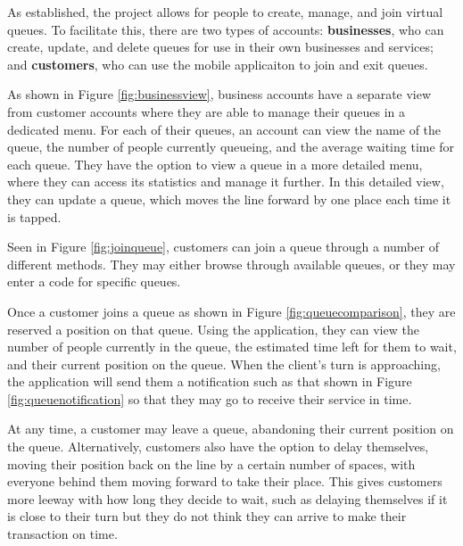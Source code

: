 As established, the project allows for people to create, manage, and join virtual queues. To facilitate this, there are two types of accounts: \textbf{businesses}, who can create, update, and delete queues for use in their own businesses and services; and \textbf{customers}, who can use the mobile applicaiton to join and exit queues.

As shown in Figure \ref{fig:businessview}, business accounts have a separate view from customer accounts where they are able to manage their queues in a dedicated menu. For each of their queues, an account can view the name of the queue, the number of people currently queueing, and the average waiting time for each queue. They have the option to view a queue in a more detailed menu, where they can access its statistics and manage it further. In this detailed view, they can update a queue, which moves the line forward by one place each time it is tapped.

Seen in Figure \ref{fig:joinqueue}, customers can join a queue through a number of different methods. They may either browse through available queues, or they may enter a code for specific queues. 

Once a customer joins a queue as shown in Figure \ref{fig:queuecomparison}, they are reserved a position on that queue. Using the application, they can view the number of people currently in the queue, the estimated time left for them to wait, and their current position on the queue. When the client’s turn is approaching, the application will send them a notification such as that shown in Figure \ref{fig:queuenotification} so that they may go to receive their service in time. 

At any time, a customer may leave a queue, abandoning their current position on the queue. Alternatively, customers also have the option to delay themselves, moving their position back on the line by a certain number of spaces, with everyone behind them moving forward to take their place. This gives customers more leeway with how long they decide to wait, such as delaying themselves if it is close to their turn but they do not think they can arrive to make their transaction on time.